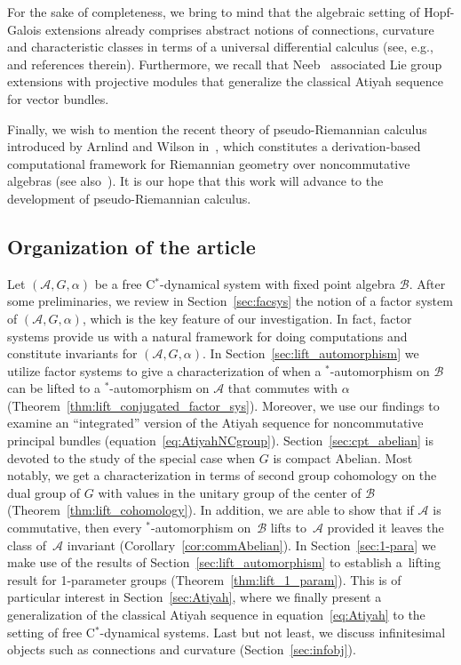\documentclass[pdftex]{sigma}
\numberwithin{equation}{section}
\newcommand*{\Star}{$^*$\nobreakdash}
\newcommand*{\alg}{\mathcal}		%
\newcommand*{\aA}{\alg{A}}			%
\newcommand*{\aB}{\alg{B}} 			%
\begin{document}
For the sake of completeness, we bring to mind that the algebraic setting of Hopf-Galois extensions already comprises abstract notions of connections, curvature and characteristic classes in terms of a universal differential calculus (see, e.g.,~\cite{BeMA20,Bre04,DGH01} and references therein).
Furthermore, we recall that Neeb~\cite{Neeb08} associated Lie group extensions with projective modules that generalize the classical Atiyah sequence for vector bundles.

Finally, we wish to mention the recent theory of pseudo-Riemannian calculus introduced by Arnlind and Wilson in~\cite{Jo17}, which constitutes a derivation-based computational framework for Riemannian geometry over noncommutative algebras (see also~\cite{Jo21, Jo18}).
It is our hope that this work will advance to the development of pseudo-Riemannian calculus.

\subsection*{Organization of the article}

Let $(\aA,G,\alpha)$ be a free C\Star-dynamical system with fixed point algebra $\aB$.
After some preliminaries, we review in Section~\ref{sec:facsys} the notion of a factor system of $(\aA,G,\alpha)$, which is the key feature of our investigation.
In fact, factor systems provide us with a natural framework for doing computations and constitute invariants for $(\aA,G,\alpha)$.
In Section~\ref{sec:lift_automorphism} we utilize factor systems to give a characterization of when a \Star-automorphism on $\aB$ can be lifted to a \Star-automorphism on $\aA$ that commutes with $\alpha$ (Theorem~\ref{thm:lift_conjugated_factor_sys}).
Moreover, we use our findings to examine an ``integrated'' version of the Atiyah sequence for noncommutative principal bundles (equation~\eqref{eq:AtiyahNCgroup}).
Section~\ref{sec:cpt_abelian} is devoted to the study of the special case when $G$ is compact Abelian.
Most notably, we get a characterization in terms of second group cohomology on the dual group of $G$ with values in the unitary group of the center of $\aB$ (Theorem~\ref{thm:lift_cohomology}).
In addition, we are able to show that if $\aA$ is commutative, then every \Star-automorphism on~$\aB$ lifts to~$\aA$ provided it leaves the class of~$\aA$ invariant (Corollary~\ref{cor:commAbelian}).
In Section~\ref{sec:1-para} we make use of the results of Section~\ref{sec:lift_automorphism} to establish a~lifting result for 1-parameter groups (Theorem~\ref{thm:lift_1_param}).
This is of particular interest in Section~\ref{sec:Atiyah}, where we finally present a generalization of the classical Atiyah sequence in equation~\eqref{eq:Atiyah} to the setting of free C\Star-dynamical systems.
Last but not least, we discuss infinitesimal objects such as connections and curvature (Section~\ref{sec:infobj}).
\end{document}
